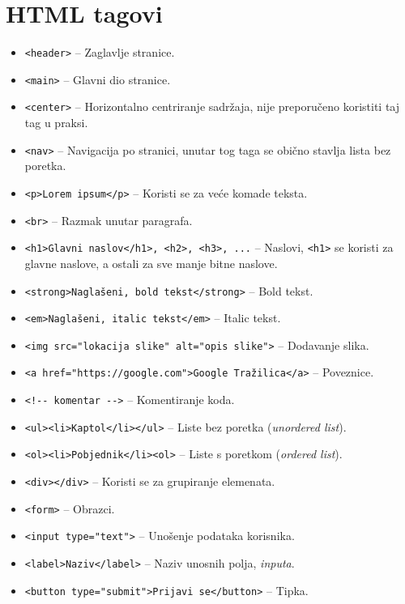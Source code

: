 \chapter{HTML tagovi}\label{ch:html-tagovi}

\begin{itemize}
    \item \verb|<header>| -- Zaglavlje stranice.
    \item \verb|<main>| -- Glavni dio stranice.
    \item \verb|<center>| -- Horizontalno centriranje sadržaja, nije preporučeno koristiti taj tag u praksi.
    \item \verb|<nav>| -- Navigacija po stranici, unutar tog taga se obično stavlja lista bez poretka.
    \item \verb|<p>Lorem ipsum</p>| -- Koristi se za veće komade teksta.
    \item \verb|<br>| -- Razmak unutar paragrafa.
    \item \verb|<h1>Glavni naslov</h1>, <h2>, <h3>, ...| -- Naslovi, \verb|<h1>| se koristi za glavne naslove, a ostali za sve manje bitne naslove.
    \item \verb|<strong>Naglašeni, bold tekst</strong>| -- Bold tekst.
    \item \verb|<em>Naglašeni, italic tekst</em>| -- Italic tekst.
    \item \verb|<img src="lokacija slike" alt="opis slike">| -- Dodavanje slika.
    \item \verb|<a href="https://google.com">Google Tražilica</a>| -- Poveznice.
    \item \verb|<!-- komentar -->| -- Komentiranje koda.
    \item \verb|<ul><li>Kaptol</li></ul>| -- Liste bez poretka (\textit{unordered list}).
    \item \verb|<ol><li>Pobjednik</li><ol>| -- Liste s poretkom (\textit{ordered list}).
    \item \verb|<div></div>| -- Koristi se za grupiranje elemenata.
    \item \verb|<form>| -- Obrazci.
    \item \verb|<input type="text">| -- Unošenje podataka korisnika.
    \item \verb|<label>Naziv</label>| -- Naziv unosnih polja, \textit{inputa}.
    \item \verb|<button type="submit">Prijavi se</button>| -- Tipka.
\end{itemize}

